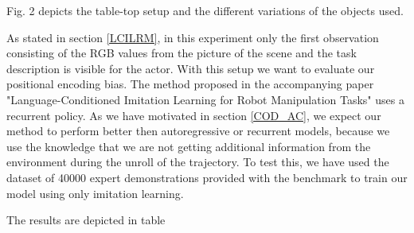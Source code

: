 Fig. 2 depicts the table-top setup and the different variations of the objects used.

As stated in section \ref{LCILRM}, in this experiment only the first observation consisting of the RGB values from the picture of the scene and the 
task description is visible for the actor. With this setup we want to evaluate our positional encoding bias. The method proposed in the accompanying 
paper "Language-Conditioned Imitation Learning for Robot Manipulation Tasks" uses a recurrent policy. As we have motivated in section \ref{COD_AC}, 
we expect our method to perform better then autoregressive or recurrent models, because we use the knowledge that we are not getting additional information 
from the environment during the unroll of the trajectory. To test this, we have used the dataset of 40000 expert demonstrations provided 
with the benchmark to train our model using only imitation learning. 

The results are depicted in table

